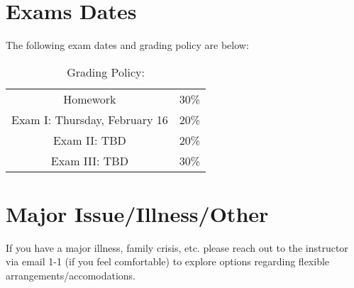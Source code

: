 \documentclass[11pt]{article}
\begin{document}
\section{Exams Dates} 
The following exam dates and grading policy are below:

\begin{table}[h!]
\caption{Grading Policy:}
\begin{center}
\begin{tabular}{cc}
Homework &30\%\\
Exam I:  Thursday, February 16 &20\%\\
Exam  II: TBD & 20\%\\
Exam III:  TBD & 30\%\\
\end{tabular}
\end{center}
\label{default}
\end{table}%

\section{Major Issue/Illness/Other}

If you have a major illness, family crisis, etc. please reach out to the instructor via email 1-1 (if you feel comfortable) to explore options regarding flexible arrangements/accomodations.
\end{document}
